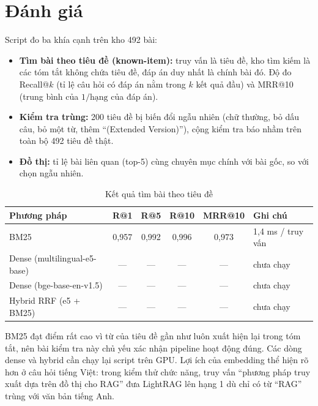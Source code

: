 \section{Đánh giá}\label{sec:danhgia}

Script  đo ba khía cạnh trên kho 492 bài:
\begin{itemize}
\item \textbf{Tìm bài theo tiêu đề (known-item):} truy vấn là tiêu đề, kho tìm kiếm là các tóm tắt không chứa tiêu
  đề, đáp án duy nhất là chính bài đó. Độ đo Recall@$k$ (tỉ lệ câu hỏi có đáp án nằm trong $k$ kết quả đầu) và
  MRR@10 (trung bình của $1/\text{hạng}$ của đáp án).
\item \textbf{Kiểm tra trùng:} 200 tiêu đề bị biến đổi ngẫu nhiên (chữ thường, bỏ dấu câu, bỏ một từ, thêm
  ``(Extended Version)''), cộng kiểm tra báo nhầm trên toàn bộ 492 tiêu đề thật.
\item \textbf{Đồ thị:} tỉ lệ bài liên quan (top-5) cùng chuyên mục chính với bài gốc, so với chọn ngẫu nhiên.
\end{itemize}

\begin{table}[H]
\centering\small{}
\begin{tabularx}{\linewidth}{@{}Lccccl@{}}
\toprule
\textbf{Phương pháp} & \textbf{R@1} & \textbf{R@5} & \textbf{R@10} & \textbf{MRR@10} & \textbf{Ghi chú}\\
\midrule
BM25 & 0,957 & 0,992 & 0,996 & 0,973 & 1,4 ms / truy vấn\\
Dense (multilingual-e5-base) & --- & --- & --- & --- & chưa chạy\\
Dense (bge-base-en-v1.5) & --- & --- & --- & --- & chưa chạy\\
Hybrid RRF (e5 + BM25) & --- & --- & --- & --- & chưa chạy\\
\bottomrule
\end{tabularx}
\caption{Kết quả tìm bài theo tiêu đề}\label{tab:knownitem}
\end{table}

BM25 đạt điểm rất cao vì từ của tiêu đề gần như luôn xuất hiện lại trong tóm tắt, nên bài kiểm tra này chủ yếu
xác nhận pipeline hoạt động đúng. Các dòng dense và hybrid cần chạy lại script trên GPU. Lợi ích của embedding thể
hiện rõ hơn ở câu hỏi tiếng Việt: trong kiểm thử chức năng, truy vấn ``phương pháp truy xuất dựa trên đồ thị cho
RAG'' đưa LightRAG lên hạng 1 dù chỉ có từ ``RAG'' trùng với văn bản tiếng Anh.

